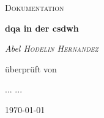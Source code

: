 \begin{titlepage}
	\thispagestyle{firstpage}
	
	\centering
	\vspace*{5cm}
	{\scshape\LARGE Dokumentation\par}
	\vspace{1.5cm}
	{\huge \bfseries \acs{dqa} in der \acs{csdwh}\par}
	\vspace{2cm}
	{\Large \itshape Abel \textsc{Hodelin Hernandez}\par} 
	\vspace{2cm}
	überprüft von\par
	... \textsc{...}
	\vfill
	
	{\large \today\par}
\end{titlepage}